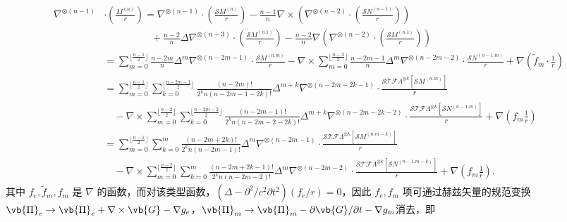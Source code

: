 \begin{align*}
	\nabla^{\otimes (n-1)}& \cdot \left( \frac{M^{(n)}}{r} \right) = \nabla^{\otimes (n-1)} \cdot \left( \frac{\mathcal{S}M^{(n)}}{r} \right) - \frac{n-1}{n} \nabla \times \left( \nabla^{\otimes (n-2)} \cdot \left( \frac{\mathcal{S}N^{(n-1)}}{r} \right) \right) \\&\hspace{2cm}+ \frac{n-2}{n} \Delta \nabla^{\otimes (n-3)} \cdot \left( \frac{\mathcal{S}M^{(n.1)}}{r} \right) - \frac{n-2}{n} \nabla \left( \nabla^{\otimes (n-2)} \cdot \left( \frac{\mathcal{S}M^{(n.1)}}{r} \right) \right)\\
	&= \sum_{m=0}^{\lfloor \frac{n-1}{2} \rfloor} \frac{n-2m}{n} \Delta^m \nabla^{\otimes (n-2m-1)} \cdot \frac{\mathcal{S}M^{(n.m)}}{r} - \nabla \times \sum_{m=0}^{\lfloor \frac{n-2}{2} \rfloor} \frac{n-2m-1}{n} \Delta^m \nabla^{\otimes (n-2m-2)} \cdot \frac{\mathcal{S}N^{(n-1.m)}}{r} + \nabla \left( \tilde{f}_m \cdot \frac{1}{r} \right) \\
	&= \sum_{m=0}^{\lfloor \frac{n-1}{2} \rfloor} \sum_{k=0}^{\lfloor \frac{n-2m-1}{2} \rfloor} \frac{(n-2m)!}{2^k n (n-2m-1-2k)!} \Delta^{m+k} \nabla^{\otimes (n-2m-2k-1)} \cdot \frac{\mathcal{STF}\Lambda^{\otimes k}[\mathcal{S}M^{(n.m)}]}{r} \\
	&\quad - \nabla \times \sum_{m=0}^{\lfloor \frac{n-2}{2} \rfloor} \sum_{k=0}^{\lfloor \frac{n-2m-2}{2} \rfloor} \frac{(n-2m-1)!}{2^k n (n-2m-2-2k)!} \Delta^{m+k} \nabla^{\otimes (n-2m-2k-2)} \cdot \frac{\mathcal{STF}\Lambda^{\otimes k}[\mathcal{S}N^{(n-1.m)}]}{r} + \nabla \left( f_m  \frac{1}{r} \right) \\
	&= \sum_{m=0}^{\lfloor \frac{n-1}{2} \rfloor} \sum_{k=0}^m \frac{(n-2m+2k)!}{2^k n (n-2m-1)!} \Delta^m \nabla^{\otimes (n-2m-1)} \cdot \frac{\mathcal{STF}\Lambda^{\otimes k}[\mathcal{S}M^{(n.m-k)}]}{r} \\
	&\quad - \nabla \times \sum_{m=0}^{\lfloor \frac{n-2}{2} \rfloor} \sum_{k=0}^m \frac{(n-2m+2k-1)!}{2^k n (n-2m-2)!} \Delta^m \nabla^{\otimes (n-2m-2)} \cdot \frac{\mathcal{STF}\Lambda^{\otimes k}[\mathcal{S}N^{(n-1.m-k)}]}{r} + \nabla \left( f_m  \frac{1}{r} \right).
\end{align*}
\normalsize
其中 \(f_e, \tilde{f}_m, f_m\) 是 \(\nabla\) 的函数，而对该类型函数，\(\left( \Delta - \partial^2/c^2 \partial t^2 \right) \left( f_e/r \right) = 0\)，因此 \(f_e, f_m\) 项可通过赫兹矢量的规范变换\(\vb{\Pi}_e \to \vb{\Pi}_e + \nabla \times \vb{G} - \nabla g_e\)，\(\vb{\Pi}_m \to \vb{\Pi}_m - \partial \vb{G}/\partial t - \nabla g_m\)消去，即
